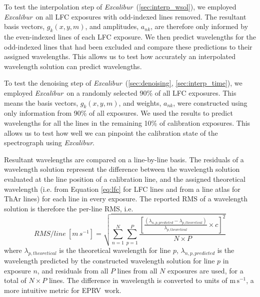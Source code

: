 \documentclass[modern]{aastex63}
\newcommand{\project}[1]{\textsl{#1}}
\newcommand{\name}{\project{Excalibur}}
\newcommand{\acronym}[1]{{\small{#1}}}
\newcommand{\eprv}{\acronym{EPRV}}
\newcommand{\mps}{\mathrm{m\,s^{-1}}}
\begin{document}
To test the interpolation step of \name\ (\textsection \ref{sec:interp_wsol}), we employed \name\ on all LFC exposures with odd-indexed lines removed.  The resultant basis vectors, $g_k(x,y,m)$,  and amplitudes, $a_{nk}$, are therefore only informed by the even-indexed lines of each LFC exposure.  We then predict wavelengths for the odd-indexed lines that had been excluded and compare these predictions to their assigned wavelengths.  This allows us to test how accurately an interpolated wavelength solution can predict wavelengths.

To test the denoising step of \name\ (\textsection \ref{sec:denoising}, \textsection\ref{sec:interp_time}), we employed \name\ on a randomly selected 90\% of all LFC exposures.  This means the basis vectors, $g_k(x,y,m)$,  and weights, $a_{nk}$, were constructed using only information from 90\% of all exposures.  We used the results to predict wavelengths for all the lines in the remaining 10\% of calibration exposures.  This allows us to test how well we can pinpoint the calibration state of the spectrograph using \name.

Resultant wavelengths are compared on a line-by-line basis.  The residuals of a wavelength solution represent the difference between the wavelength solution evaluated at the line position of a calibration line, and the assigned theoretical wavelength (i.e. from Equation \ref{eq:lfc} for LFC lines and from a line atlas for ThAr lines) for each line in every exposure.  The reported RMS of a wavelength solution is therefore the per-line RMS, i.e.
\begin{equation}
RMS/line \: [m\,s^{-1}] = \sqrt{\sum_{n=1}^N\sum_{p=1}^P\frac{[ \frac{(\lambda_{n,p,predicted} - \lambda_{p,theoretical})}{\lambda_{p,theoretical}} \times c ]^2}{N \times P}}
\label{eq:rms}
\end{equation}
where $\lambda_{p,theoretical}$ is the theoretical wavelength for line $p$, $\lambda_{n,p,predicted}$ is the wavelength predicted by the constructed wavelength solution for line $p$ in exposure $n$, and residuals from all $P$ lines from all $N$ exposures are used, for a total of $N \times P$ lines.  The difference in wavelength is converted to units of $\mps$, a more intuitive metric for \eprv\ work.
\end{document}
